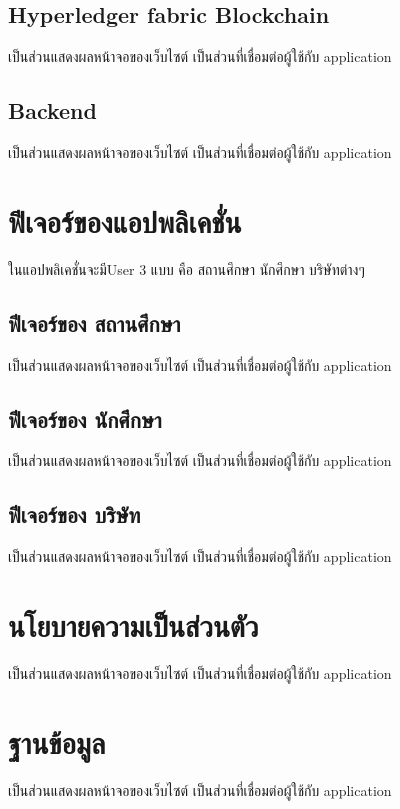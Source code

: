 \subsection{Hyperledger fabric Blockchain}
\enskip \enskip \enskip \enskip \enskip 
เป็นส่วนแสดงผลหน้าจอของเว็บไซต์ เป็นส่วนที่เชื่อมต่อผู้ใช้กับ application

\subsection{Backend}
\enskip \enskip \enskip \enskip \enskip 
เป็นส่วนแสดงผลหน้าจอของเว็บไซต์ เป็นส่วนที่เชื่อมต่อผู้ใช้กับ application

\section{ฟีเจอร์ของแอปพลิเคชั่น}
\enskip \enskip \enskip \enskip \enskip
ในแอปพลิเคชั่นจะมีUser 3 แบบ คือ สถานศึกษา นักศึกษา บริษัทต่างๆ

\subsection{ฟีเจอร์ของ สถานศึกษา}
\enskip \enskip \enskip \enskip \enskip 
เป็นส่วนแสดงผลหน้าจอของเว็บไซต์ เป็นส่วนที่เชื่อมต่อผู้ใช้กับ application
\subsection{ฟีเจอร์ของ นักศึกษา}
\enskip \enskip \enskip \enskip \enskip 
เป็นส่วนแสดงผลหน้าจอของเว็บไซต์ เป็นส่วนที่เชื่อมต่อผู้ใช้กับ application
\subsection{ฟีเจอร์ของ บริษัท}
\enskip \enskip \enskip \enskip \enskip 
เป็นส่วนแสดงผลหน้าจอของเว็บไซต์ เป็นส่วนที่เชื่อมต่อผู้ใช้กับ application

\section{นโยบายความเป็นส่วนตัว}
\enskip \enskip \enskip \enskip \enskip 
เป็นส่วนแสดงผลหน้าจอของเว็บไซต์ เป็นส่วนที่เชื่อมต่อผู้ใช้กับ application


\section{ฐานข้อมูล}
\enskip \enskip \enskip \enskip \enskip 
เป็นส่วนแสดงผลหน้าจอของเว็บไซต์ เป็นส่วนที่เชื่อมต่อผู้ใช้กับ application



  
  

